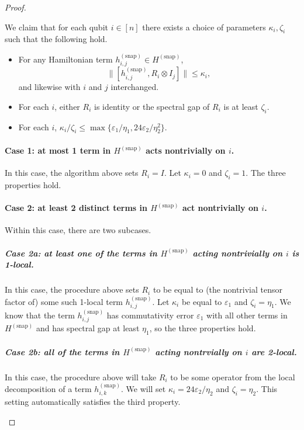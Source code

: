 \documentclass[11pt]{article}
\theoremstyle{plain}
\newcommand{\eps}{\varepsilon}
\newcommand{\AnandNote}[1]{\textcolor{red}{(Anand: #1)}}
\newcommand{\AnandNote}[1]{}
\newcommand{\snp}{{(\mathrm{snap})}}
\begin{document}
\begin{proof}
\begin{enumerate}
\begin{enumerate}
    \end{enumerate}
    We claim that for each qubit $i \in [n]$ there exists a choice of parameters $\kappa_i, \zeta_i$ such that the following hold.
    \begin{itemize}
        \item For any Hamiltonian term $h^\snp_{i,j} \in H^\snp$,
        \[ \|[ h^\snp_{i,j}, R_i \otimes I_j] \| \leq \kappa_i, \]
        and likewise with $i$ and $j$ interchanged.
        \item For each $i$, either $R_i$ is identity or the spectral gap of $R_i$ is at least $\zeta_i$.
        \item For each $i$, $\kappa_i/\zeta_i \leq \max\{ \eps_1 /\eta_1, 24\eps_2/\eta_2^2\}$.
    \end{itemize}
    
    \paragraph{Case 1: at most 1 term in $H^\snp$ acts nontrivially on $i$.} In this case, the algorithm above sets $R_i = I$. Let $\kappa_i = 0$ and $\zeta_i = 1$. The three properties hold.


\paragraph{Case 2: at least 2 distinct terms in $H^\snp$ act nontrivially on $i$.}

Within this case, there are two subcases.

\subparagraph{Case 2a: at least one of the terms in $H^\snp$ acting nontrivially on $i$ is 1-local.}

In this case, the procedure above sets $R_i$ to be equal to (the nontrivial tensor factor of) some such 1-local term $h^\snp_{i,j}$. Let $\kappa_i$ be equal to $\eps_1$ and $\zeta_i = \eta_1$. We know that the term $h^\snp_{i,j}$ has commutativity error $\eps_1$ with all other terms in $H^\snp$ and has spectral gap at least $\eta_1$, so the three properties hold.

\subparagraph{Case 2b: all of the terms in $H^\snp$ acting nontrvially on $i$ are 2-local.}

In this case, the procedure above will take $R_i$ to be some operator from the local decomposition of a term $h^\snp_{i,k}$. We will set $\kappa_i = 24\eps_2/\eta_2$ and $\zeta_i = \eta_2$. This setting automatically satisfies the third property.


\end{enumerate}
\end{proof}
\end{document}

